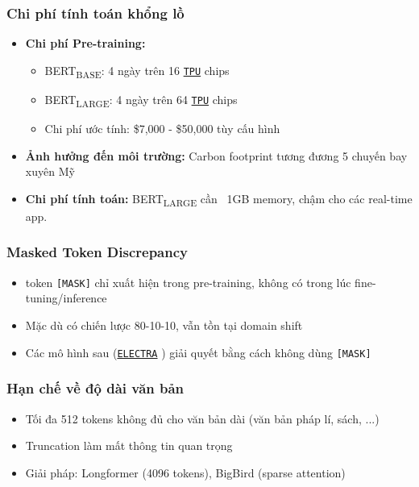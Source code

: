 \subsubsection{Chi phí tính toán khổng lồ}
\begin{itemize}
    \item \textbf{Chi phí Pre-training:}
    \begin{itemize}
        \item BERT\textsubscript{BASE}: 4 ngày trên 16 \hyperref[acro:tpu]{\texttt{TPU}} chips \cite{devlin2018bert}
        \item BERT\textsubscript{LARGE}: 4 ngày trên 64 \hyperref[acro:tpu]{\texttt{TPU}} chips \cite{devlin2018bert}
        \item Chi phí ước tính: \$7,000 - \$50,000 tùy cấu hình
    \end{itemize}
    \item \textbf{Ảnh hưởng đến môi trường:} Carbon footprint tương đương 5 chuyến bay xuyên Mỹ
    \item \textbf{Chi phí tính toán:} BERT\textsubscript{LARGE} cần ~1GB memory, chậm cho các real-time app.
\end{itemize}

\subsubsection{Masked Token Discrepancy}
\begin{itemize}
    \item token \texttt{[MASK]} chỉ xuất hiện trong pre-training, không có trong lúc fine-tuning/inference
    \item Mặc dù có chiến lược 80-10-10, vẫn tồn tại domain shift
    \item Các mô hình sau (\hyperref[acro:electra]{\texttt{ELECTRA}} \cite{clark2020electra}) giải quyết bằng cách không dùng \texttt{[MASK]}
\end{itemize}

\subsubsection{Hạn chế về độ dài văn bản}
\begin{itemize}
    \item Tối đa 512 tokens không đủ cho văn bản dài (văn bản pháp lí, sách, ...)
    \item Truncation làm mất thông tin quan trọng
    \item Giải pháp: Longformer \cite{beltagy2020longformer} (4096 tokens), BigBird (sparse attention)
\end{itemize}

